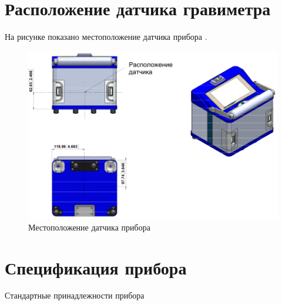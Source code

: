 \section[Расположение датчика]{Расположение датчика гравиметра \cg{}}

На рисунке показано местоположение датчика прибора \cg{}.

\newpage
\begin{figure}[h]
  \centering
  \includegraphics[width=\textwidth]{figures/the_cg6_autograv_sensor_location}
  \caption{Местоположение датчика прибора \cg{}}
  \label{fig:the_cg6_autograv_sensor_location}
\end{figure}

\section{Спецификация прибора}

Стандартные принадлежности прибора \cg{}

